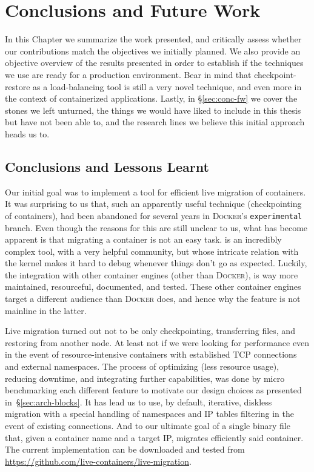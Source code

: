 \chapter{Conclusions and Future Work} \label{chap:conclusion}

In this Chapter we summarize the work presented, and critically assess whether our contributions match the objectives we initially planned.
We also provide an objective overview of the results presented in order to establish if the techniques we use are ready for a production environment.
Bear in mind that checkpoint-restore as a load-balancing tool is still a very novel technique, and even more in the context of containerized applications.
Lastly, in \S\ref{sec:conc-fw} we cover the stones we left unturned, the things we would have liked to include in this thesis but have not been able to, and the research lines we believe this initial approach heads us to.

\section{Conclusions and Lessons Learnt}

Our initial goal was to implement a tool for efficient live migration of containers.
It was surprising to us that, such an apparently useful technique (checkpointing of containers), had been abandoned for several years in \textsc{Docker}'s \texttt{experimental} branch.
Even though the reasons for this are still unclear to us, what has become apparent is that migrating a container is not an easy task.
\criu is an incredibly complex tool, with a very helpful community, but whose intricate relation with the kernel makes it hard to debug whenever things don't go as expected.
Luckily, the integration with other container engines (other than \textsc{Docker}), is way more maintained, resourceful, documented, and tested.
These other container engines target a different audience than \textsc{Docker} does, and hence why the feature is not mainline in the latter.

Live migration turned out not to be only checkpointing, transferring files, and restoring from another node.
At least not if we were looking for performance even in the event of resource-intensive containers with established TCP connections and external namespaces.
The process of optimizing (less resource usage), reducing downtime, and integrating further capabilities, was done by micro benchmarking each different feature to motivate our design choices as presented in~\S\ref{sec:arch-blocks}.
It has lead us to use, by default, iterative, diskless migration with a special handling of namespaces and IP tables filtering in the event of existing connections.
And to our ultimate goal of a single binary file that, given a container name and a target IP, migrates efficiently said container.
The current implementation can be downloaded and tested from \url{https://github.com/live-containers/live-migration}.

